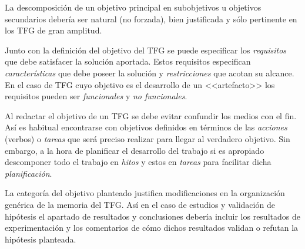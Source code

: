 La descomposición de un objetivo principal en subobjetivos u objetivos secundarios debería ser natural (no forzada), bien justificada y sólo pertinente en los TFG de gran amplitud.

Junto con la definición del objetivo del TFG se puede especificar los \emph{requisitos} que debe satisfacer la solución aportada. Estos requisitos especifican \emph{características} que debe poseer la solución y \emph{restricciones} que acotan su alcance. En el caso de TFG cuyo objetivo es el desarrollo de un <<artefacto>> los requisitos pueden ser \emph{funcionales} y \emph{no funcionales}.

Al redactar el objetivo de un TFG se debe evitar confundir los medios con el fin. Así es habitual encontrarse con objetivos definidos en términos de las \emph{acciones} (verbos) o \emph{tareas} que será preciso realizar para llegar al verdadero objetivo. Sin embargo, a la hora de planificar el desarrollo del trabajo si es apropiado descomponer todo el trabajo en \emph{hitos} y estos en \emph{tareas} para facilitar dicha \emph{planificación}.


La categoría del objetivo planteado justifica modificaciones en la organización genérica de la memoria del TFG. Así en el caso de estudios y validación de hipótesis el apartado de resultados y conclusiones debería incluir los resultados de experimentación y los comentarios de cómo dichos resultados validan o refutan la hipótesis planteada.
